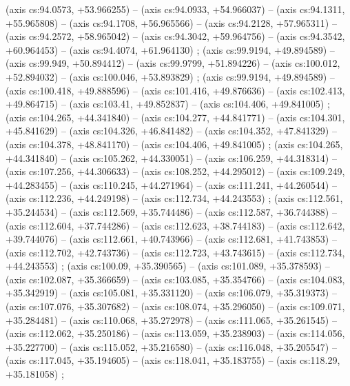     (axis cs:94.0573,    +53.966255) --  (axis cs:94.0933,    +54.966037) --  (axis cs:94.1311,    +55.965808) --  (axis cs:94.1708,    +56.965566) --  (axis cs:94.2128,    +57.965311) --  (axis cs:94.2572,    +58.965042) --  (axis cs:94.3042,    +59.964756) --  (axis cs:94.3542,    +60.964453) --  (axis cs:94.4074,    +61.964130) ;
    (axis cs:99.9194,    +49.894589) --  (axis cs:99.949,    +50.894412) --  (axis cs:99.9799,    +51.894226) --  (axis cs:100.012,    +52.894032) --  (axis cs:100.046,    +53.893829) ;
    (axis cs:99.9194,    +49.894589) --  (axis cs:100.418,    +49.888596) --  (axis cs:101.416,    +49.876636) --  (axis cs:102.413,    +49.864715) --  (axis cs:103.41,    +49.852837) --  (axis cs:104.406,    +49.841005) ;
    (axis cs:104.265,    +44.341840) --  (axis cs:104.277,    +44.841771) --  (axis cs:104.301,    +45.841629) --  (axis cs:104.326,    +46.841482) --  (axis cs:104.352,    +47.841329) --  (axis cs:104.378,    +48.841170) --  (axis cs:104.406,    +49.841005) ;
    (axis cs:104.265,    +44.341840) --  (axis cs:105.262,    +44.330051) --  (axis cs:106.259,    +44.318314) --  (axis cs:107.256,    +44.306633) --  (axis cs:108.252,    +44.295012) --  (axis cs:109.249,    +44.283455) --  (axis cs:110.245,    +44.271964) --  (axis cs:111.241,    +44.260544) --  (axis cs:112.236,    +44.249198) --  (axis cs:112.734,    +44.243553) ;
    (axis cs:112.561,    +35.244534) --  (axis cs:112.569,    +35.744486) --  (axis cs:112.587,    +36.744388) --  (axis cs:112.604,    +37.744286) --  (axis cs:112.623,    +38.744183) --  (axis cs:112.642,    +39.744076) --  (axis cs:112.661,    +40.743966) --  (axis cs:112.681,    +41.743853) --  (axis cs:112.702,    +42.743736) --  (axis cs:112.723,    +43.743615) --  (axis cs:112.734,    +44.243553) ;
    (axis cs:100.09,    +35.390565) --  (axis cs:101.089,    +35.378593) --  (axis cs:102.087,    +35.366659) --  (axis cs:103.085,    +35.354766) --  (axis cs:104.083,    +35.342919) --  (axis cs:105.081,    +35.331120) --  (axis cs:106.079,    +35.319373) --  (axis cs:107.076,    +35.307682) --  (axis cs:108.074,    +35.296050) --  (axis cs:109.071,    +35.284481) --  (axis cs:110.068,    +35.272978) --  (axis cs:111.065,    +35.261545) --  (axis cs:112.062,    +35.250186) --  (axis cs:113.059,    +35.238903) --  (axis cs:114.056,    +35.227700) --  (axis cs:115.052,    +35.216580) --  (axis cs:116.048,    +35.205547) --  (axis cs:117.045,    +35.194605) --  (axis cs:118.041,    +35.183755) --  (axis cs:118.29,    +35.181058) ;
